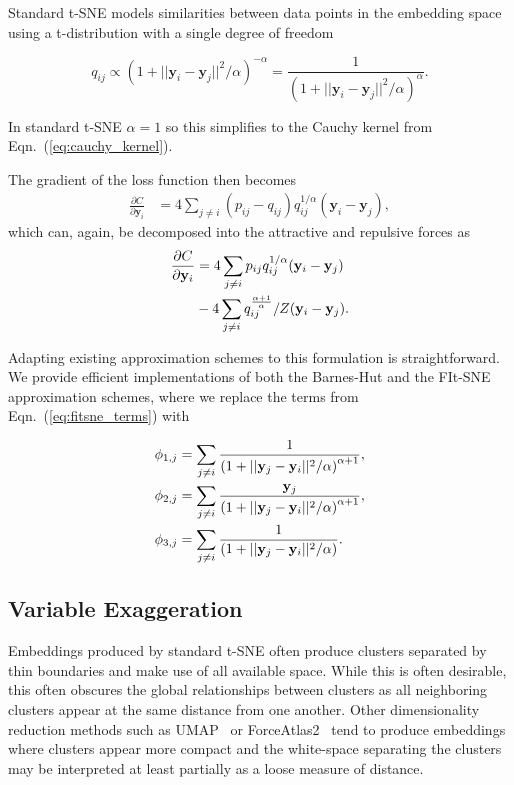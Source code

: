 \documentclass[twocolumn]{bmcart}
\begin{document}
Standard t-SNE models similarities between data points in the embedding space using a t-distribution with a single degree of freedom

\begin{equation}
q_{ij} \propto \left ( 1 + || \mathbf{y}_i - \mathbf{y}_j ||^2 / \alpha \right )^{-\alpha} = \frac{1}{\left( 1 + || \mathbf{y}_i - \mathbf{y}_j ||^2 / \alpha \right)^\alpha }.
\end{equation}

In standard t-SNE $\alpha=1$ so this simplifies to the Cauchy kernel from Eqn.~(\ref{eq:cauchy_kernel}).

The gradient of the loss function then becomes
\begin{align}
\frac{\partial C}{\partial \mathbf{y}_i} &= 4 \sum_{j \neq i} \left ( p_{ij} - q_{ij} \right ) q_{ij}^{1/\alpha} \left ( \mathbf{y}_i - \mathbf{y}_j \right ),
\end{align}
which can, again, be decomposed into the attractive and repulsive forces as
\begin{align}
\frac{\partial C}{\partial \mathbf{y}_i} &= 4 \sum_{j \neq i} p_{ij} q_{ij}^{1/\alpha} (\mathbf{y}_i - \mathbf{y}_j) \notag \\
&- 4 \sum_{j \neq i} q_{ij}^{\frac{\alpha+1}{\alpha}} / Z (\mathbf{y}_i - \mathbf{y}_j).
\end{align}

Adapting existing approximation schemes to this formulation is straightforward. We provide efficient implementations of both the Barnes-Hut and the FIt-SNE approximation schemes, where we replace the terms from Eqn.~(\ref{eq:fitsne_terms}) with

\begin{align}
\phi_{1,j} &= \sum_{j \neq i} \frac{1}{\left( 1 + || \mathbf{y}_j - \mathbf{y}_i ||^2 / \alpha \right)^{\alpha+1}}, \notag \\
\phi_{2,j} &= \sum_{j \neq i} \frac{\mathbf{y}_j}{\left( 1 + || \mathbf{y}_j - \mathbf{y}_i ||^2 / \alpha \right)^{\alpha+1}}, \notag \\
\phi_{3,j} &= \sum_{j \neq i} \frac{1}{\left( 1 + || \mathbf{y}_j - \mathbf{y}_i ||^2 / \alpha \right)}. \notag
\end{align}

\subsection*{Variable Exaggeration}

Embeddings produced by standard t-SNE often produce clusters separated by thin boundaries and make use of all available space. While this is often desirable, this often obscures the global relationships between clusters as all neighboring clusters appear at the same distance from one another. Other dimensionality reduction methods such as UMAP~\cite{2018arXivUMAP} or ForceAtlas2~\cite{jacomy2014forceatlas2} tend to produce embeddings where clusters appear more compact and the white-space separating the clusters may be interpreted at least partially as a loose measure of distance.
\end{document}
